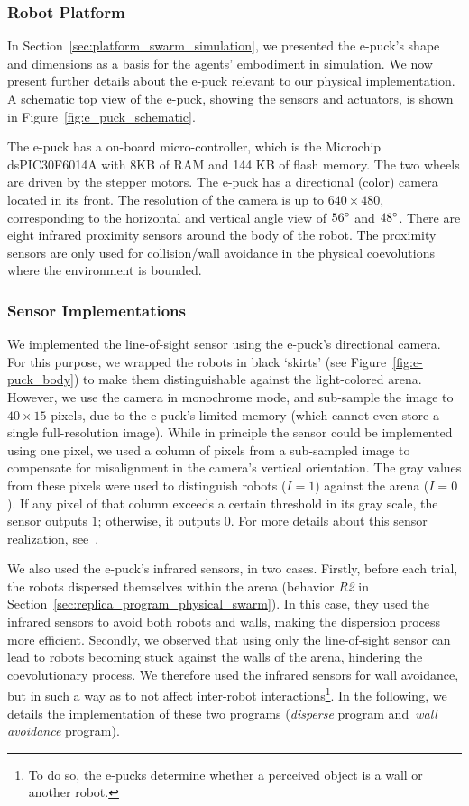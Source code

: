 \subsubsection{Robot Platform}

In Section~\ref{sec:platform_swarm_simulation}, we presented the e-puck's shape and dimensions as a basis for the agents' embodiment in simulation. We now present further details about the e-puck relevant to our physical implementation. A schematic top view of the e-puck, showing the sensors and actuators, is shown in Figure~\ref{fig:e_puck_schematic}.

The e-puck has a on-board micro-controller, which is the Microchip dsPIC30F6014A with 8KB of RAM and 144 KB of flash memory. The two wheels are driven by the stepper motors. The e-puck has a directional (color) camera located in its front. The resolution of the camera is up to $640\times480$, corresponding to the horizontal and vertical angle view of $56\degree$ and $48\degree$. There are eight infrared proximity sensors around the body of the robot. The proximity sensors are only used for collision/wall avoidance in the physical coevolutions where the environment is bounded. 

\subsubsection{Sensor Implementations}

We implemented the line-of-sight sensor using the e-puck's directional camera. For this purpose, we wrapped the robots in black `skirts' (see Figure~\ref{fig:e-puck_body}) to make them distinguishable against the light-colored arena.  However, we use the camera in monochrome mode, and sub-sample the image to $40 \times 15$ pixels, due to the e-puck's limited memory (which cannot even store a single full-resolution image). While in principle the sensor could be implemented using one pixel, we used a column of pixels from a sub-sampled image to compensate for misalignment in the camera's vertical orientation. The gray values from these pixels were used to distinguish robots ($I=1$) against the arena ($I=0$). If any pixel of that column exceeds a certain threshold in its gray scale, the sensor outputs $1$; otherwise, it outputs $0$. For more details about this sensor realization, see~\cite{Gauci2014_ijrr}.

We also used the e-puck's infrared sensors, in two cases. Firstly, before each trial, the robots dispersed themselves within the arena (behavior \textit{R2} in Section~\ref{sec:replica_program_physical_swarm}). In this case, they used the infrared sensors to avoid both robots and walls, making the dispersion process more efficient. Secondly, we observed that using only the line-of-sight sensor can lead to robots becoming stuck against the walls of the arena, hindering the coevolutionary process. We therefore used the infrared sensors for wall avoidance, but in such a way as to not affect inter-robot interactions\footnote{To do so, the e-pucks determine whether a perceived object is a wall or another robot.}. In the following, we details the implementation of these two programs (\textit{disperse} program and~\textit{wall avoidance} program). 

